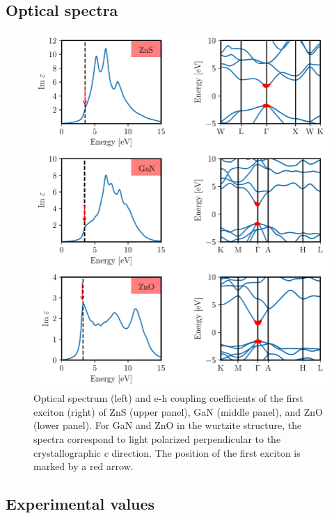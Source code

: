 \subsection{Optical spectra}\label{app_excana}

\begin{figure}[H]

  \includegraphics{work/plots/spectra/spectrum_zns_gan_zno.pdf}%
  \caption[Optical spectrum for ZnS, GaN and ZnO.]{Optical spectrum (left) and e-h coupling coefficients of the first exciton (right) of ZnS (upper panel), GaN (middle panel), and ZnO (lower panel). For  GaN and ZnO in the wurtzite structure, the spectra correspond to  light polarized perpendicular to the crystallographic $c$ direction. The position of the first exciton is marked by a red arrow. \label{spectrum_appendix}}
\end{figure}


\newpage
\subsection{Experimental values}

